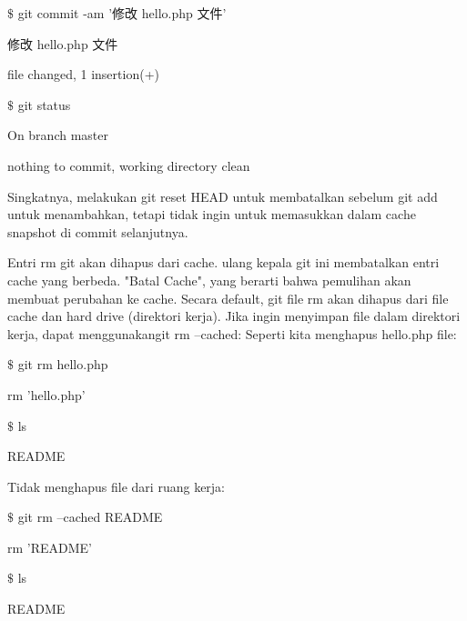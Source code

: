 \noindent 
{\fontsize{10pt}{10pt}\selectfont  $  \$  $ git commit -am '修改 hello.php 文件'} \par
\noindent 
{\fontsize{10pt}{10pt}\selectfont [master 760f74d] 修改 hello.php 文件} \par
\noindent 
{\fontsize{10pt}{10pt} file changed, 1 insertion(+)} \par
\noindent 
{\fontsize{10pt}{10pt}\selectfont  $  \$  $ git status} \par
\noindent 
{\fontsize{10pt}{10pt}\selectfont On branch master} \par
\noindent 
{\fontsize{10pt}{10pt}\selectfont nothing to commit, working directory clean} \par
\vspace{10pt}
\hspace*{0.5in} Singkatnya, melakukan git reset HEAD untuk membatalkan sebelum git add untuk menambahkan, tetapi tidak ingin untuk memasukkan dalam cache snapshot di commit selanjutnya. \par
\hspace*{0.5in} Entri rm git akan dihapus dari cache. ulang kepala git ini membatalkan entri cache yang berbeda. "Batal Cache", yang berarti bahwa pemulihan akan membuat perubahan ke cache.  Secara default, git file rm akan dihapus dari file cache dan hard drive  (direktori kerja). Jika ingin menyimpan file dalam direktori kerja, dapat menggunakangit rm --cached: Seperti kita menghapus hello.php file:  \par
\noindent 
{\fontsize{10pt}{10pt}\selectfont  $  \$  $ git rm hello.php } \par
\noindent 
{\fontsize{10pt}{10pt}\selectfont rm 'hello.php'} \par
\noindent 
{\fontsize{10pt}{10pt}\selectfont  $  \$  $ ls} \par
\noindent 
{\fontsize{10pt}{10pt}\selectfont README} \par

\vspace{50pt}
Tidak menghapus file dari ruang kerja:  \par
\noindent 
{\fontsize{10pt}{10pt}\selectfont  $  \$  $ git rm --cached README } \par
\noindent 
{\fontsize{10pt}{10pt}\selectfont rm 'README'} \par
\noindent 
{\fontsize{10pt}{10pt}\selectfont  $  \$  $ ls} \par
\noindent
{\fontsize{10pt}{10pt}\selectfont README} \par

